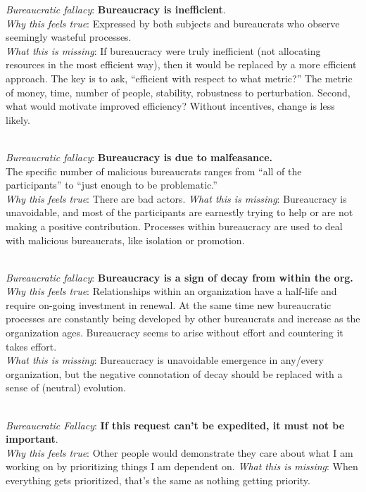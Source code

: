 \textit{Bureaucratic fallacy}: \textbf{Bureaucracy is inefficient}. \\
\textit{Why this feels true}: Expressed by both subjects and bureaucrats who observe seemingly wasteful processes.\\
\textit{What this is missing}: If bureaucracy were truly inefficient (not allocating resources in the most efficient way), then it would be replaced by a more efficient approach. The key is to ask, ``efficient with respect to what metric?'' The metric of money, time, number of people, stability, robustness to perturbation.  Second, what would motivate improved efficiency? Without incentives, change is less likely. 

\ \\

\textit{Bureaucratic fallacy}: \textbf{Bureaucracy is due to malfeasance.}\\
The specific number of malicious bureaucrats ranges from ``all of the participants'' to ``just enough to be problematic.'' \\
\textit{Why this feels true}: There are bad actors. 
\textit{What this is missing}: Bureaucracy is unavoidable, and most of the participants are earnestly trying to help or are not making a positive contribution. Processes within bureaucracy are used to deal with malicious bureaucrats, like isolation or promotion. 

\ \\

\textit{Bureaucratic fallacy}: \textbf{Bureaucracy is a sign of decay from within the org.} \\
\textit{Why this feels true}: Relationships within an organization have a half-life and require on-going investment in renewal. At the same time new bureaucratic processes are constantly being developed by other bureaucrats and increase as the organization ages. Bureaucracy seems to arise without effort and countering it takes effort.  \\
\textit{What this is missing}: Bureaucracy is unavoidable emergence in any/every organization, but the negative connotation of decay should be replaced with a sense of (neutral) evolution.

\ \\

\textit{Bureaucratic Fallacy}: \textbf{If this request can't be expedited, it must not be important}.  \\
\textit{Why this feels true}: Other people would demonstrate they care about what I am working on by prioritizing things I am dependent on.
\textit{What this is missing}: When everything gets prioritized, that's the same as nothing getting priority.

